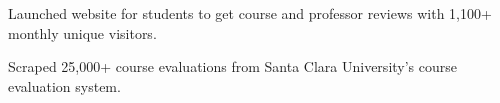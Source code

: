 \documentclass[]{deedy-resume-openfont}
\begin{document}






\hfill{}

\begin{tightemize}
\item Launched website for students to get course and professor reviews with 1,100+ monthly unique visitors.
\item Scraped 25,000+ course evaluations from Santa Clara University's course evaluation system.
\end{tightemize}
\end{document}
